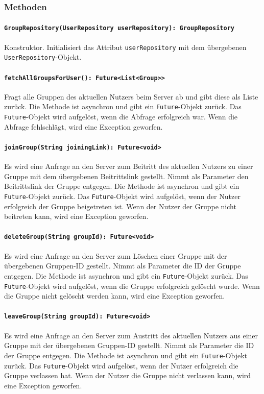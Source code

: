 \documentclass{entwurfsheft}
\begin{document}
\subsubsection*{Methoden}
\paragraph{\texttt{GroupRepository(UserRepository userRepository): GroupRepository}}
Konstruktor. Initialisiert das Attribut \texttt{userRepository} mit dem übergebenen \texttt{UserRepository}-Objekt.
\paragraph{\texttt{fetchAllGroupsForUser(): Future<List<Group>>}}
Fragt alle Gruppen des aktuellen Nutzers beim Server ab und gibt diese als Liste zurück. Die Methode ist asynchron und gibt ein \texttt{Future}-Objekt zurück. Das \texttt{Future}-Objekt wird aufgelöst, wenn die Abfrage erfolgreich war. Wenn die Abfrage fehlschlägt, wird eine Exception geworfen.
\paragraph{\texttt{joinGroup(String joiningLink): Future<void>}}
Es wird eine Anfrage an den Server zum Beitritt des aktuellen Nutzers zu einer Gruppe mit dem übergebenen Beitrittslink gestellt. Nimmt als Parameter den Beitrittslink der Gruppe entgegen. Die Methode ist asynchron und gibt ein \texttt{Future}-Objekt zurück. Das \texttt{Future}-Objekt wird aufgelöst, wenn der Nutzer erfolgreich der Gruppe beigetreten ist. Wenn der Nutzer der Gruppe nicht beitreten kann, wird eine Exception geworfen.
\paragraph{\texttt{deleteGroup(String groupId): Future<void>}}
Es wird eine Anfrage an den Server zum Löschen einer Gruppe mit der übergebenen Gruppen-ID gestellt. Nimmt als Parameter die ID der Gruppe entgegen. Die Methode ist asynchron und gibt ein \texttt{Future}-Objekt zurück. Das \texttt{Future}-Objekt wird aufgelöst, wenn die Gruppe erfolgreich gelöscht wurde. Wenn die Gruppe nicht gelöscht werden kann, wird eine Exception geworfen.
\paragraph{\texttt{leaveGroup(String groupId): Future<void>}}
Es wird eine Anfrage an den Server zum Austritt des aktuellen Nutzers aus einer Gruppe mit der übergebenen Gruppen-ID gestellt. Nimmt als Parameter die ID der Gruppe entgegen. Die Methode ist asynchron und gibt ein \texttt{Future}-Objekt zurück. Das \texttt{Future}-Objekt wird aufgelöst, wenn der Nutzer erfolgreich die Gruppe verlassen hat. Wenn der Nutzer die Gruppe nicht verlassen kann, wird eine Exception geworfen.
\end{document}
